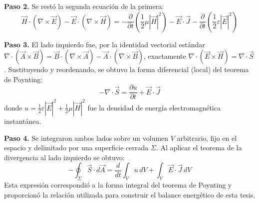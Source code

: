 \textbf{Paso 2.} Se restó la segunda ecuación de la primera:
\begin{equation}
    \vec{H}\cdot(\nabla\times\vec{E}) - \vec{E}\cdot(\nabla\times\vec{H}) = -\frac{\partial}{\partial t}\left(\frac{1}{2}\mu|\vec{H}|^2\right) - \vec{E}\cdot\vec{J} - \frac{\partial}{\partial t}\left(\frac{1}{2}\varepsilon|\vec{E}|^2\right)
\end{equation}

\textbf{Paso 3.} El lado izquierdo fue, por la identidad vectorial estándar $\nabla\cdot(\vec{A}\times\vec{B}) = \vec{B}\cdot(\nabla\times\vec{A}) - \vec{A}\cdot(\nabla\times\vec{B})$, exactamente $\nabla\cdot(\vec{E}\times\vec{H}) = \nabla\cdot\vec{S}$. Sustituyendo y reordenando, se obtuvo la forma diferencial (local) del teorema de Poynting:
\begin{equation}
    \boxed{-\nabla\cdot\vec{S} = \frac{\partial u}{\partial t} + \vec{E}\cdot\vec{J}}
\end{equation}
donde $u = \frac{1}{2}\varepsilon|\vec{E}|^2 + \frac{1}{2}\mu|\vec{H}|^2$ fue la densidad de energía electromagnética instantánea.

\textbf{Paso 4.} Se integraron ambos lados sobre un volumen $V$ arbitrario, fijo en el espacio y delimitado por una superficie cerrada $\Sigma$. Al aplicar el teorema de la divergencia al lado izquierdo se obtuvo:
\begin{equation}
    \boxed{-\oint_\Sigma \vec{S}\cdot d\vec{A} = \frac{d}{dt}\int_V u\, dV + \int_V \vec{E}\cdot\vec{J}\, dV}
\end{equation}
Esta expresión correspondió a la forma integral del teorema de Poynting y proporcionó la relación utilizada para construir el balance energético de esta tesis.

